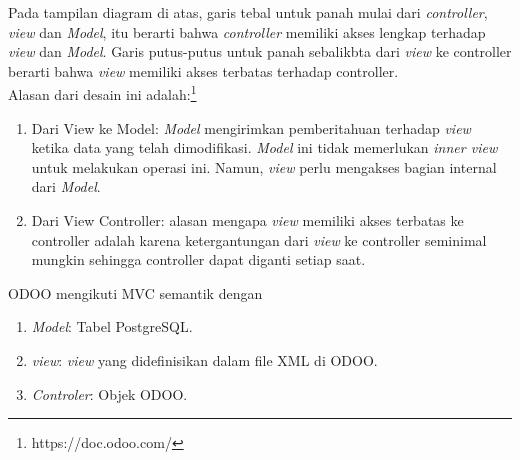 Pada tampilan diagram di atas, garis tebal untuk panah mulai dari \textit{controller}, \textit{view} dan \textit{Model}, itu berarti bahwa \textit{controller} memiliki akses lengkap terhadap \textit{view} dan \textit{Model}. Garis putus-putus untuk panah sebalikbta dari \textit{view} ke controller berarti bahwa \textit{view} memiliki akses terbatas terhadap controller.\\
Alasan dari desain ini adalah:\footnote{https://doc.odoo.com/}
\begin{enumerate}
	\item Dari View ke Model: \textit{Model} mengirimkan pemberitahuan terhadap \textit{view} ketika data yang telah dimodifikasi. \textit{Model} ini tidak memerlukan \textit{inner view} untuk melakukan operasi ini. Namun, \textit{view} perlu mengakses bagian internal dari \textit{Model}.
	\item Dari View Controller: alasan mengapa \textit{view} memiliki akses terbatas ke controller adalah karena ketergantungan dari \textit{view} ke controller seminimal mungkin sehingga controller dapat diganti setiap saat.
\end{enumerate}

ODOO mengikuti MVC semantik dengan
\begin{enumerate}
	\item \textit{Model}: Tabel PostgreSQL.
	\item \textit{view}: \textit{view} yang didefinisikan dalam file XML di ODOO.
	\item \textit{Controler}: Objek ODOO.
\end{enumerate}

